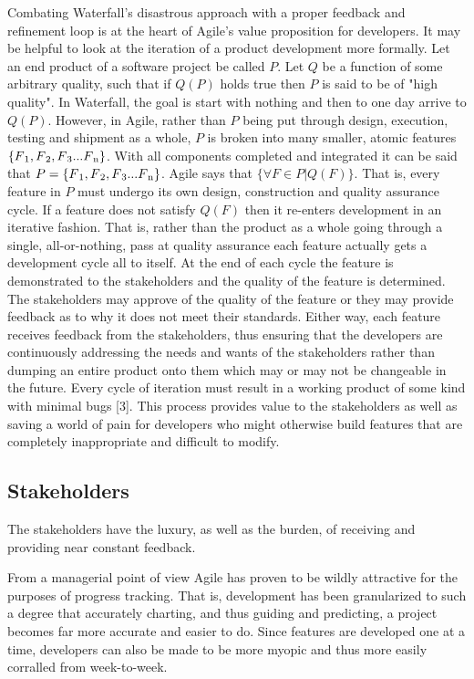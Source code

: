 \documentclass[format=acmsmall, review=false, screen=true, anonymous=True]{acmart}
\begin{document}
Combating Waterfall’s disastrous approach with a proper feedback and refinement loop is at the heart of Agile’s value proposition for developers. It may be helpful to look at the iteration of a product development more formally. Let an end product of a software project be called $P$. Let $Q$ be a function of some arbitrary quality, such that if $Q(P)$ holds true then $P$ is said to be of "high quality". In Waterfall, the goal is start with nothing and then to one day arrive to $Q(P)$. However, in Agile, rather than $P$ being put through design, execution, testing and shipment as a whole, $P$ is broken into many smaller, atomic features $\{F\textsubscript{1}, F\textsubscript{2}, F\textsubscript{3} ... F\textsubscript{n}\}$. With all components completed and integrated it can be said that $P = \{F\textsubscript{1}, F\textsubscript{2}, F\textsubscript{3} ... F\textsubscript{n}\}$. Agile says that $\{\forall F \in P | Q(F)\}$. That is, every feature in $P$ must undergo its own design, construction and quality assurance cycle. If a feature does not satisfy $Q(F)$ then it re-enters development in an iterative fashion. That is, rather than the product as a whole going through a single, all-or-nothing, pass at quality assurance each feature actually gets a development cycle all to itself. At the end of each cycle the feature is demonstrated to the stakeholders and the quality of the feature is determined. The stakeholders may approve of the quality of the feature or they may provide feedback as to why it does not meet their standards. Either way, each feature receives feedback from the stakeholders, thus ensuring that the developers are continuously addressing the needs and wants of the stakeholders rather than dumping an entire product onto them which may or may not be changeable in the future. Every cycle of iteration must result in a working product of some kind with minimal bugs [3]. This process provides value to the stakeholders as well as saving a world of pain for developers who might otherwise build features that are completely inappropriate and difficult to modify.

\subsection{Stakeholders}
The stakeholders have the luxury, as well as the burden, of receiving and providing near constant feedback.

  From a managerial point of view Agile has proven to be wildly attractive for the purposes of progress tracking. That is, development has been granularized to such a degree that accurately charting, and thus guiding and predicting, a project becomes far more accurate and easier to do. Since features are developed one at a time, developers can also be made to be more myopic and thus more easily corralled from week-to-week.
\end{document}

